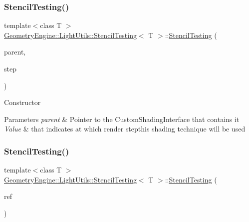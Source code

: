 \subsubsection{\texorpdfstring{StencilTesting()}{StencilTesting()}\hspace{0.1cm}{\footnotesize\ttfamily [1/2]}}
{\footnotesize\ttfamily template$<$class T $>$ \\
\mbox{\hyperlink{class_geometry_engine_1_1_light_utils_1_1_stencil_testing}{Geometry\+Engine\+::\+Light\+Utils\+::\+Stencil\+Testing}}$<$ T $>$\+::\mbox{\hyperlink{class_geometry_engine_1_1_light_utils_1_1_stencil_testing}{Stencil\+Testing}} (\begin{DoxyParamCaption}\item[{\mbox{\hyperlink{class_geometry_engine_1_1_light_utils_1_1_light_component_manager}{Light\+Component\+Manager}} $\ast$}]{parent,  }\item[{\mbox{\hyperlink{namespace_geometry_engine_1_1_light_utils_a16eb370137c2fd151e6f8e1d07cd23e0}{Light\+Shading}}}]{step }\end{DoxyParamCaption})\hspace{0.3cm}{\ttfamily [inline]}}

Constructor 
\begin{DoxyParams}{Parameters}
{\em parent} & Pointer to the Custom\+Shading\+Interface that contains it \\
\hline
{\em Value} & that indicates at which render stepthis shading technique will be used \\
\hline
\end{DoxyParams}
\mbox{\label{class_geometry_engine_1_1_light_utils_1_1_stencil_testing_aa333a1bda43da59fa905610ac120eb73}} 
\subsubsection{\texorpdfstring{StencilTesting()}{StencilTesting()}\hspace{0.1cm}{\footnotesize\ttfamily [2/2]}}
{\footnotesize\ttfamily template$<$class T $>$ \\
\mbox{\hyperlink{class_geometry_engine_1_1_light_utils_1_1_stencil_testing}{Geometry\+Engine\+::\+Light\+Utils\+::\+Stencil\+Testing}}$<$ T $>$\+::\mbox{\hyperlink{class_geometry_engine_1_1_light_utils_1_1_stencil_testing}{Stencil\+Testing}} (\begin{DoxyParamCaption}\item[{const \mbox{\hyperlink{class_geometry_engine_1_1_light_utils_1_1_light_shading_component}{Light\+Shading\+Component}} \&}]{ref }\end{DoxyParamCaption})\hspace{0.3cm}{\ttfamily [inline]}}

